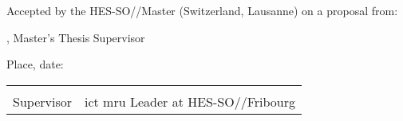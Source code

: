 Accepted by the HES-SO//Master (Switzerland, Lausanne) on a proposal from:

\vspace{0.5cm}

\Supervisor, Master's Thesis Supervisor\\

\vspace{1cm}

Place, date: \underline{\hspace{8cm}}

\vspace{3cm}

{ \renewcommand{\arraystretch}{1.5}
\begin{tabularx}{\textwidth}{X X}
	\Supervisor  & \MRU\\
	Supervisor   & \acrshort{ict} \acrshort{mru} Leader at HES-SO//Fribourg\\
\end{tabularx}
}